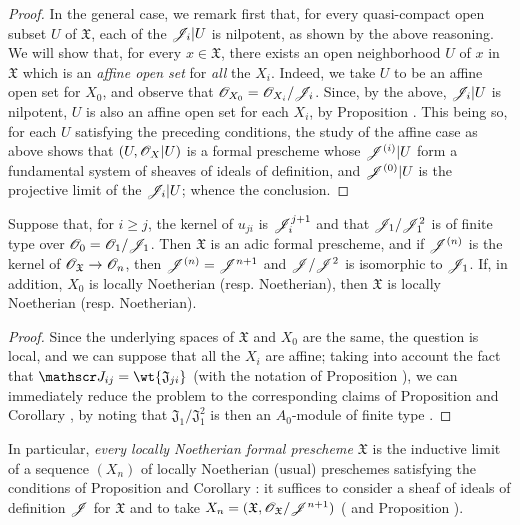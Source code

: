 \begin{proof}
In the general case, we remark first that, for every quasi-compact open subset $U$ of $\mathfrak{X}$, each of the $\mathscr{J}_i|U$ is nilpotent, as shown by the above reasoning.
We will show that, for every $x\in\mathfrak{X}$, there exists an open neighborhood $U$ of $x$ in $\mathfrak{X}$ which is an \emph{affine open set} for \emph{all} the $X_i$.
Indeed, we take $U$ to be an affine open set for $X_0$, and observe that $\mathscr{O}_{X_0}=\mathscr{O}_{X_i}/\mathscr{J}_i$.
Since, by the above, $\mathscr{J}_i|U$ is nilpotent, $U$ is also an affine open set for each $X_i$, by Proposition .
This being so, for each $U$ satisfying the preceding conditions, the study of the affine case as above shows that $(U,\mathscr{O}_X|U)$ is a formal prescheme whose $\mathscr{J}^{(i)}|U$ form a fundamental system of sheaves of ideals of definition, and $\mathscr{J}^{(0)}|U$ is the projective limit of the $\mathscr{J}_i|U$; whence the conclusion.
\end{proof}

\begin{corollary}[10.6.4]
\label{1.10.6.4}
Suppose that, for $i\geq j$, the kernel of $u_{ji}$ is $\mathscr{J}_i^{j+1}$ and that $\mathscr{J}_1/\mathscr{J}_1^2$
is of finite type over $\mathscr{O}_0=\mathscr{O}_1/\mathscr{J}_1$.
Then $\mathfrak{X}$ is an adic formal prescheme, and if $\mathscr{J}^{(n)}$ is the kernel of $\sh{O}_\mathfrak{X}\to\sh{O}_n$, then $\mathscr{J}^{(n)}=\mathscr{J}^{n+1}$ and $\mathscr{J}/\mathscr{J}^2$ is isomorphic to $\mathscr{J}_1$.
If, in addition, $X_0$ is locally Noetherian (resp. Noetherian), then $\mathfrak{X}$ is locally Noetherian (resp. Noetherian).
\end{corollary}

\begin{proof}
\label{proof-1.10.6.4}
Since the underlying spaces of $\mathfrak{X}$ and $X_0$ are the same, the question is local, and we can suppose that all the $X_i$ are affine; taking into account the fact that $\sh{J}_{ij}=\wt{\mathfrak{J}_{ji}}$ (with the notation of Proposition ), we can immediately reduce the problem to the corresponding claims of Proposition  and Corollary , by noting that $\mathfrak{J}_1/\mathfrak{J}_1^2$ is then an $A_0$-module of finite type .
\end{proof}

In particular, \emph{every locally Noetherian formal prescheme $\mathfrak{X}$} is the inductive limit of a sequence $(X_n)$ of locally Noetherian (usual) preschemes satisfying the conditions of Proposition  and Corollary : it suffices to consider a sheaf of ideals of definition $\mathscr{J}$ for $\mathfrak{X}$  and to take $X_n=(\mathfrak{X},\mathscr{O}_\mathfrak{X}/\mathscr{J}^{n+1})$ ( and Proposition ).

